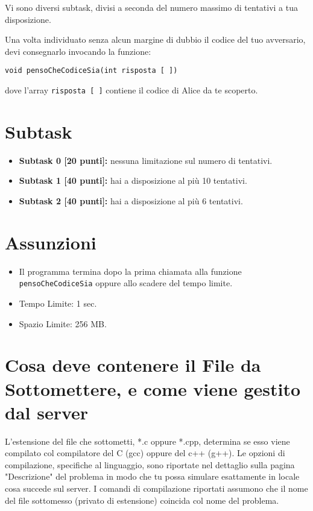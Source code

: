 \documentclass[a4paper,11pt]{article}
\begin{document}
\medskip
\noindent
Vi sono diversi subtask, divisi a seconda del numero massimo di tentativi a tua disposizione. 
  
\medskip
\noindent
Una volta individuato senza alcun margine di dubbio il codice del tuo avversario, devi consegnarlo invocando la funzione:
  
\medskip
  
\noindent
\texttt{void pensoCheCodiceSia(int risposta [ ])}

\medskip
\noindent
dove l'array \texttt{risposta [ ]} contiene il codice di Alice da te scoperto.
  
\section*{Subtask}
\begin{itemize}
\item \textbf{Subtask 0 [20 punti]:} nessuna limitazione sul numero di tentativi.
\item \textbf{Subtask 1 [40 punti]:} hai a disposizione al pi\`u 10 tentativi.
\item \textbf{Subtask 2 [40 punti]:} hai a disposizione al pi\`u 6 tentativi.
\end{itemize}
  
  \section*{Assunzioni}
  \begin{itemize}[nolistsep, noitemsep]
    \item Il programma termina dopo la prima chiamata alla funzione \texttt{pensoCheCodiceSia} oppure allo scadere del tempo limite.
    \item Tempo Limite: 1 sec.
    \item Spazio Limite: 256 MB.
  \end{itemize}


  \section*{Cosa deve contenere il File da Sottomettere, e come viene gestito dal server}

\noindent
  L'estensione del file che sottometti, *.c oppure *.cpp,
  determina se esso viene compilato col compilatore del C (gcc)   oppure del c++ (g++).
  Le opzioni di compilazione, specifiche al linguaggio,
  sono riportate nel dettaglio sulla pagina "Descrizione" del problema
  in modo che tu possa simulare esattamente in locale cosa succede sul server.
  I comandi di compilazione riportati assumono che il nome del file sottomesso (privato di estensione) coincida col nome del problema.
\end{document}
